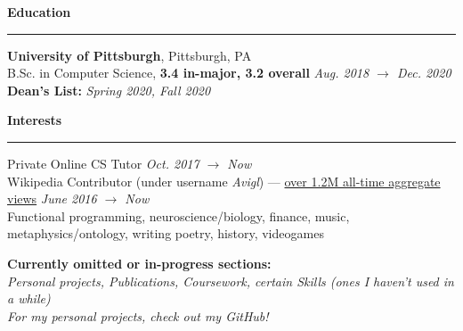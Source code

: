 \documentclass[10pt]{article}
\begin{document}
\begin{flushleft}
		\vspace{1.5mm}
		{\large \raggedright \textbf{Education}}
		\vspace{1.25mm}
	
		\hrule
		
		\vspace{2.25mm}
		\textbf{University of Pittsburgh}, Pittsburgh, PA\\
      	{\small B.Sc. in Computer Science, \textbf{3.4 in-major, 3.2 overall} \hfill \textit{Aug. 2018 $\rightarrow$ Dec. 2020}}\\
		{\small \textbf{Dean's List:} \textit{Spring 2020, Fall 2020}}\\

		\vspace{1.25mm}
		{\large \raggedright \textbf{Interests}}
		\vspace{1.25mm}
	
		\hrule
	
		\vspace{2.25mm}
		Private Online CS Tutor \hfill \textit{\small Oct. 2017 $\rightarrow$ Now}\\
		Wikipedia Contributor (under username \textit{Avigl}) --- \href{https://pageviews.wmcloud.org/?project=en.wikipedia.org&platform=all-access&agent=user&redirects=0&range=all-time&pages=Timeline_of_social_media|Timeline_of_online_advertising|Timeline_of_e-commerce|Screening_Partnership_Program|Silicon_Valley_Education_Foundation|Chicago_Community_Trust}{over 1.2M all-time aggregate views} \hfill \textit{\small June 2016 $\rightarrow$ Now}\\
		Functional programming, neuroscience/biology, finance, music, metaphysics/ontology, writing poetry, history, videogames

		\vspace*{\fill}
		\textbf{Currently omitted or in-progress sections:}\\ 
		\textit{Personal projects, Publications, Coursework, certain Skills (ones I haven't used in a while)}\\
		{\footnotesize \textit{For my personal projects, check out my GitHub!}}
	\end{flushleft}
\end{document}
